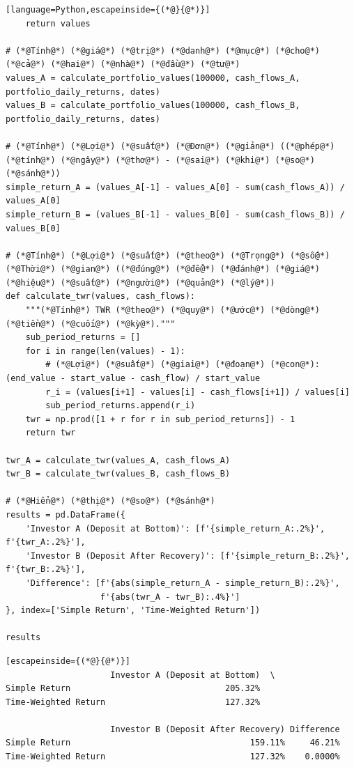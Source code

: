 \begin{lstlisting}[language=Python,escapeinside={(*@}{@*)}]
    return values

# (*@Tính@*) (*@giá@*) (*@trị@*) (*@danh@*) (*@mục@*) (*@cho@*) (*@cả@*) (*@hai@*) (*@nhà@*) (*@đầu@*) (*@tư@*)
values_A = calculate_portfolio_values(100000, cash_flows_A, portfolio_daily_returns, dates)
values_B = calculate_portfolio_values(100000, cash_flows_B, portfolio_daily_returns, dates)

# (*@Tính@*) (*@Lợi@*) (*@suất@*) (*@Đơn@*) (*@giản@*) ((*@phép@*) (*@tính@*) (*@ngây@*) (*@thơ@*) - (*@sai@*) (*@khi@*) (*@so@*) (*@sánh@*))
simple_return_A = (values_A[-1] - values_A[0] - sum(cash_flows_A)) / values_A[0]
simple_return_B = (values_B[-1] - values_B[0] - sum(cash_flows_B)) / values_B[0]

# (*@Tính@*) (*@Lợi@*) (*@suất@*) (*@theo@*) (*@Trọng@*) (*@số@*) (*@Thời@*) (*@gian@*) ((*@đúng@*) (*@để@*) (*@đánh@*) (*@giá@*) (*@hiệu@*) (*@suất@*) (*@người@*) (*@quản@*) (*@lý@*))
def calculate_twr(values, cash_flows):
    """(*@Tính@*) TWR (*@theo@*) (*@quy@*) (*@ước@*) (*@dòng@*) (*@tiền@*) (*@cuối@*) (*@kỳ@*)."""
    sub_period_returns = []
    for i in range(len(values) - 1):
        # (*@Lợi@*) (*@suất@*) (*@giai@*) (*@đoạn@*) (*@con@*): (end_value - start_value - cash_flow) / start_value
        r_i = (values[i+1] - values[i] - cash_flows[i+1]) / values[i]
        sub_period_returns.append(r_i)
    twr = np.prod([1 + r for r in sub_period_returns]) - 1
    return twr

twr_A = calculate_twr(values_A, cash_flows_A)
twr_B = calculate_twr(values_B, cash_flows_B)

# (*@Hiển@*) (*@thị@*) (*@so@*) (*@sánh@*)
results = pd.DataFrame({
    'Investor A (Deposit at Bottom)': [f'{simple_return_A:.2%}', f'{twr_A:.2%}'],
    'Investor B (Deposit After Recovery)': [f'{simple_return_B:.2%}', f'{twr_B:.2%}'],
    'Difference': [f'{abs(simple_return_A - simple_return_B):.2%}',
                   f'{abs(twr_A - twr_B):.4%}']
}, index=['Simple Return', 'Time-Weighted Return'])

results
\end{lstlisting}

\begin{lstlisting}[escapeinside={(*@}{@*)}]
                     Investor A (Deposit at Bottom)  \
Simple Return                               205.32%
Time-Weighted Return                        127.32%

                     Investor B (Deposit After Recovery) Difference
Simple Return                                    159.11%     46.21%
Time-Weighted Return                             127.32%    0.0000%
\end{lstlisting}

